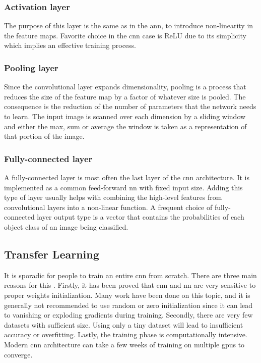         \subsubsection{Activation layer}\label{activation_layer}
            The purpose of this layer is the same as in the \gls{ann}, to introduce non-linearity in the feature maps. Favorite choice in the \gls{cnn} case is ReLU due to its simplicity which implies an effective training process.
            
        \subsubsection{Pooling layer}\label{pooling_layer}
            Since the convolutional layer expands dimensionality, pooling is a process that reduces the size of the feature map by a factor of whatever size is pooled. The consequence is the reduction of the number of parameters that the network needs to learn. The input image is scanned over each dimension by a sliding window and either the max, sum or average the window is taken as a representation of that portion of the image. 
            
        \subsubsection{Fully-connected layer}
            A fully-connected layer is most often the last layer of the \gls{cnn} architecture. It is implemented as a common feed-forward \gls{nn} with fixed input size. Adding this type of layer usually helps with combining the high-level features from convolutional layers into a non-linear function. A frequent choice of fully-connected layer output type is a vector that contains the probabilities of each object class of an image being classified.

    \subsection{Transfer Learning}
        It is sporadic for people to train an entire \gls{cnn} from scratch. There are three main reasons for this \cite{cs231n}. Firstly, it has been proved that \gls{cnn} and \gls{nn} are very sensitive to proper weights initialization. Many work \cite{glorot2010understanding, he2015delving} have been done on this topic, and it is generally not recommended to use random or zero initialization since it can lead to vanishing or exploding gradients during training. Secondly, there are very few datasets with sufficient size. Using only a tiny dataset will lead to insufficient accuracy or overfitting. Lastly, the training phase is computationally intensive. Modern \gls{cnn} architecture can take a few weeks of training on multiple \gls{gpu}s to converge.

